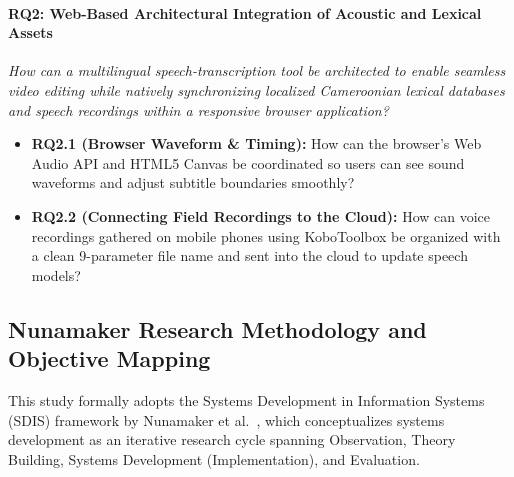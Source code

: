\documentclass[conference]{IEEEtran}
\begin{document}
\paragraph{\textbf{RQ2: Web-Based Architectural Integration of Acoustic and Lexical Assets}}
\textit{How can a multilingual speech-transcription tool be architected to enable seamless video editing while natively synchronizing localized Cameroonian lexical databases and speech recordings within a responsive browser application?}
\begin{itemize}
    \item \textbf{RQ2.1 (Browser Waveform \& Timing):} How can the browser's Web Audio API and HTML5 Canvas be coordinated so users can see sound waveforms and adjust subtitle boundaries smoothly?
    \item \textbf{RQ2.2 (Connecting Field Recordings to the Cloud):} How can voice recordings gathered on mobile phones using KoboToolbox be organized with a clean 9-parameter file name and sent into the cloud to update speech models?
\end{itemize}

\subsection{Nunamaker Research Methodology and Objective Mapping}
\label{sec:intro:methodology}

This study formally adopts the Systems Development in Information Systems (SDIS) framework by Nunamaker et al.~\cite{nunamaker1990systems}, which conceptualizes systems development as an iterative research cycle spanning Observation, Theory Building, Systems Development (Implementation), and Evaluation.
\end{document}
